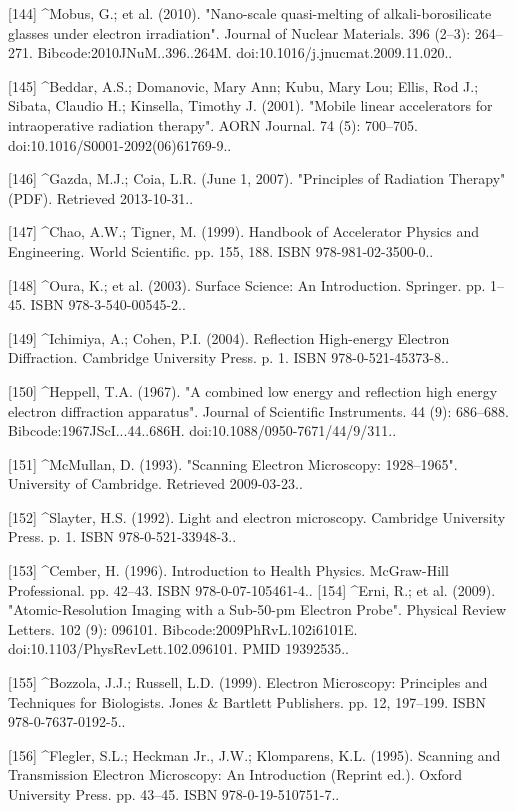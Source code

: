 [144]
^Mobus, G.; et al. (2010). "Nano-scale quasi-melting of alkali-borosilicate glasses under electron irradiation". Journal of Nuclear Materials. 396 (2–3): 264–271. Bibcode:2010JNuM..396..264M. doi:10.1016/j.jnucmat.2009.11.020..

[145]
^Beddar, A.S.; Domanovic, Mary Ann; Kubu, Mary Lou; Ellis, Rod J.; Sibata, Claudio H.; Kinsella, Timothy J. (2001). "Mobile linear accelerators for intraoperative radiation therapy". AORN Journal. 74 (5): 700–705. doi:10.1016/S0001-2092(06)61769-9..

[146]
^Gazda, M.J.; Coia, L.R. (June 1, 2007). "Principles of Radiation Therapy" (PDF). Retrieved 2013-10-31..

[147]
^Chao, A.W.; Tigner, M. (1999). Handbook of Accelerator Physics and Engineering. World Scientific. pp. 155, 188. ISBN 978-981-02-3500-0..

[148]
^Oura, K.; et al. (2003). Surface Science: An Introduction. Springer. pp. 1–45. ISBN 978-3-540-00545-2..

[149]
^Ichimiya, A.; Cohen, P.I. (2004). Reflection High-energy Electron Diffraction. Cambridge University Press. p. 1. ISBN 978-0-521-45373-8..

[150]
^Heppell, T.A. (1967). "A combined low energy and reflection high energy electron diffraction apparatus". Journal of Scientific Instruments. 44 (9): 686–688. Bibcode:1967JScI...44..686H. doi:10.1088/0950-7671/44/9/311..

[151]
^McMullan, D. (1993). "Scanning Electron Microscopy: 1928–1965". University of Cambridge. Retrieved 2009-03-23..

[152]
^Slayter, H.S. (1992). Light and electron microscopy. Cambridge University Press. p. 1. ISBN 978-0-521-33948-3..

[153]
^Cember, H. (1996). Introduction to Health Physics. McGraw-Hill Professional. pp. 42–43. ISBN 978-0-07-105461-4..
[154]
^Erni, R.; et al. (2009). "Atomic-Resolution Imaging with a Sub-50-pm Electron Probe". Physical Review Letters. 102 (9): 096101. Bibcode:2009PhRvL.102i6101E. doi:10.1103/PhysRevLett.102.096101. PMID 19392535..

[155]
^Bozzola, J.J.; Russell, L.D. (1999). Electron Microscopy: Principles and Techniques for Biologists. Jones & Bartlett Publishers. pp. 12, 197–199. ISBN 978-0-7637-0192-5..

[156]
^Flegler, S.L.; Heckman Jr., J.W.; Klomparens, K.L. (1995). Scanning and Transmission Electron Microscopy: An Introduction (Reprint ed.). Oxford University Press. pp. 43–45. ISBN 978-0-19-510751-7..


